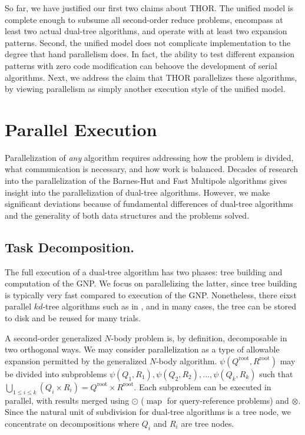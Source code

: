 \documentclass[twoside,leqno,twocolumn]{article}
\newcommand{\Union}{\bigcup}
\DeclareMathOperator*{\map}{map}
\newcommand{\gnp}{\psi}
\newcommand{\mysub}[1]{\subsection{#1.}}
\newcommand{\kdroot}[1]{#1^{\text{root}}}
\begin{document}
So far, we have justified our first two claims about THOR.
The unified model is complete enough to subsume all second-order reduce problems, encompass at least two actual dual-tree algorithms, and operate with at least two expansion patterns.
Second, the unified model does not complicate implementation to the degree that hand parallelism does.
In fact, the ability to test different expansion patterns with zero code modification can behoove the development of serial algorithms.
Next, we address the claim that THOR parallelizes these algorithms, by viewing parallelism as simply another execution style of the unified model.

\section{Parallel Execution}

Parallelization of {\em any} algorithm requires addressing how the problem is divided, what communication is necessary, and how work is balanced.
Decades of research into the parallelization of the Barnes-Hut and Fast Multipole algorithms gives insight into the parallelization of dual-tree algorithms.
However, we make significant deviations because of fundamental differences of dual-tree algorithms and the generality of both data structures and the problems solved.

\mysub{Task Decomposition}

The full execution of a dual-tree algorithm has two phases: tree building and computation of the GNP.
We focus on parallelizing the latter, since tree building is typically very fast compared to execution of the GNP.
Nonetheless, there eixst parallel $kd$-tree algorithms such as in \cite{alfuraih00parallel}, and in many cases, the tree can be stored to disk and be reused for many trials.

A second-order generalized $N$-body problem is, by definition, decomposable in two orthogonal ways.
We may consider parallelization as a type of allowable expansion permitted by the generalized $N$-body algorithm.
$\gnp(\kdroot{Q}, \kdroot{R})$ may be divided into subproblems $\gnp(Q_1,R_1), \gnp(Q_2,R_2), ..., \gnp(Q_k, R_k)$ such that $\Union_{1 \leq i \leq k} (Q_i \times R_i) = \kdroot{Q} \times \kdroot{R}$.
Each subproblem can be executed in parallel, with results merged using $\odot$ ($\map$ for query-reference problems) and $\otimes$.
Since the natural unit of subdivision for dual-tree algorithms is a tree node, we concentrate on decompositions where $Q_i$ and $R_i$ are tree nodes.
\end{document}
